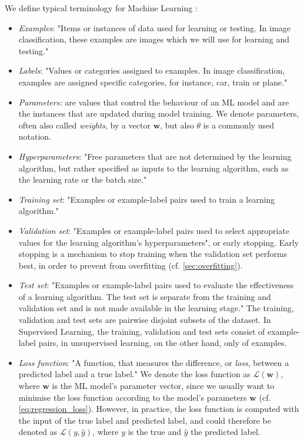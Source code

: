 We define typical terminology for Machine Learning \cite{mohri_foundations_2018}:
\begin{itemize}
    \item \textit{Examples}: "Items or instances of data used for learning or testing. In image classification, these examples are images which we will use for learning and testing."
    \item \textit{Labels}: "Values or categories assigned to examples. In image classification, examples are assigned specific categories, for instance, car, train or plane."
    \item \textit{Parameters:} are values that control the behaviour of an ML model and are the instances that are updated during model training. We denote parameters, often also called \textit{weights}, by a vector $\mathbf{w}$, but also $\theta$ is a commonly used notation. 
    \item \textit{Hyperparameters}: "Free parameters that are not determined by the learning algorithm, but rather specified as inputs to the learning algorithm, such as the learning rate or the batch size."
    \item \textit{Training set}: "Examples or example-label pairs used to train a learning algorithm."
    \item \textit{Validation set}: "Examples or example-label pairs used to select appropriate values for the learning algorithm’s hyperparameters", or early stopping. Early stopping is a mechanism to stop training when the validation set performs best, in order to prevent from overfitting (cf. \cref{sec:overfitting}).
    \item \textit{Test set}: "Examples or example-label pairs used to evaluate the effectiveness of a learning algorithm. The test set is separate from the training and validation set and is not made available in the learning stage." The training, validation and test sets are pairwise disjoint subsets of the dataset. In Supervised Learning, the training, validation and test sets consist of example-label pairs, in unsupervised learning, on the other hand, only of examples.
    \item \textit{Loss function}: "A function, that measures the difference, or \textit{loss}, between a predicted label and a true label." We denote the loss function as $\mathcal{L}(\mathbf{w})$, where $\mathbf{w}$ is the ML model's parameter vector, since we usually want to minimise the loss function according to the model's parameters $\mathbf{w}$ (cf. \cref{eq:regression_loss}). However, in practice, the loss function is computed with the input of the true label and predicted label, and could therefore be denoted as $\mathcal{L}(y,\hat{y})$, where $y$ is the true and $\hat{y}$ the predicted label.
\end{itemize}

